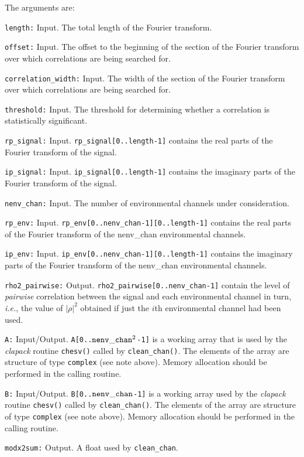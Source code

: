The arguments are:
\begin{description}
\item{\tt length:} Input. The total length of the Fourier transform.
\item{\tt offset:} Input. The offset to the beginning of the section
  of the Fourier transform over which correlations are being searched for.
\item{\tt correlation\_width:} Input.  The width of the section
  of the Fourier transform over which correlations are being searched for.
\item{\tt threshold:} Input. The threshold for determining whether a
correlation is statistically significant.
\item{\tt rp\_signal:} Input. {\tt  rp\_signal[0..length-1]} contains the
  real parts of the Fourier transform of the signal.
\item{\tt ip\_signal:} Input. {\tt  ip\_signal[0..length-1]} contains the
  imaginary parts of the Fourier transform of the signal.
\item{\tt nenv\_chan:} Input. The number of environmental channels under
  consideration.
\item{\tt rp\_env:} Input. {\tt  rp\_env[0..nenv\_chan-1][0..length-1]} contains the
  real parts of the Fourier transform of the nenv\_chan environmental channels.
\item{\tt ip\_env:} Input. {\tt  ip\_env[0..nenv\_chan-1][0..length-1]} contains the
  imaginary parts of the Fourier transform of the nenv\_chan environmental
  channels.
\item{\tt rho2\_pairwise:} Output. {\tt rho2\_pairwise[0..nenv\_chan-1]} contain
  the level of {\it pairwise} correlation between  the signal and each
  environmental channel in turn, {\it i.e.}, the value of $|\rho|^2$ 
  obtained if just the $i$th environmental channel had been used.
\item{\tt A:} Input/Output. {\tt A[0..${\tt nenv\_chan}^2$-1]} is a working
  array that is used by the {\sl clapack} routine {\tt chesv()} called by {\tt clean\_chan()}.  
  The elements of the array are structure of type {\tt complex} (see
  note above).  Memory allocation should be performed in the
  calling routine.
\item{\tt B:} Input/Output. {\tt B[0..${\tt nenv\_chan}$-1]} is a working
  array used by the {\sl clapack} routine {\tt chesv()} called by {\tt clean\_chan()}.  
  The elements of the array are structure of type {\tt complex} (see
  note above).  Memory allocation should  be performed in the
  calling routine.
\item{\tt modx2sum:} Output.  A float used by {\tt clean\_chan}.
\end{description}

